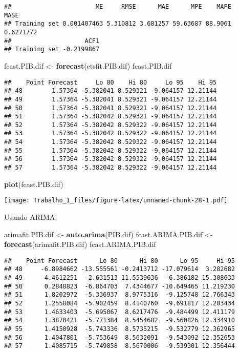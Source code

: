 \documentclass[]{article}
\newenvironment{Shaded}{\begin{snugshade}}{\end{snugshade}}
\newcommand{\KeywordTok}[1]{\textcolor[rgb]{0.13,0.29,0.53}{\textbf{#1}}}
\newcommand{\StringTok}[1]{\textcolor[rgb]{0.31,0.60,0.02}{#1}}
\newcommand{\NormalTok}[1]{#1}
\begin{document}
\begin{verbatim}
##                       ME     RMSE      MAE      MPE    MAPE      MASE
## Training set 0.001407463 5.310812 3.681257 59.63687 88.9061 0.6271772
##                    ACF1
## Training set -0.2199867
\end{verbatim}

\begin{Shaded}
\begin{Highlighting}[]
\NormalTok{fcast.PIB.dif <-}\StringTok{ }\KeywordTok{forecast}\NormalTok{(etsfit.PIB.dif)}
\NormalTok{fcast.PIB.dif}
\end{Highlighting}
\end{Shaded}

\begin{verbatim}
##    Point Forecast     Lo 80    Hi 80     Lo 95    Hi 95
## 48        1.57364 -5.382041 8.529321 -9.064157 12.21144
## 49        1.57364 -5.382041 8.529321 -9.064157 12.21144
## 50        1.57364 -5.382041 8.529321 -9.064157 12.21144
## 51        1.57364 -5.382042 8.529321 -9.064157 12.21144
## 52        1.57364 -5.382042 8.529322 -9.064157 12.21144
## 53        1.57364 -5.382042 8.529322 -9.064157 12.21144
## 54        1.57364 -5.382042 8.529322 -9.064157 12.21144
## 55        1.57364 -5.382042 8.529322 -9.064157 12.21144
## 56        1.57364 -5.382042 8.529322 -9.064157 12.21144
## 57        1.57364 -5.382042 8.529322 -9.064157 12.21144
\end{verbatim}

\begin{Shaded}
\begin{Highlighting}[]
\KeywordTok{plot}\NormalTok{(fcast.PIB.dif)}
\end{Highlighting}
\end{Shaded}

\texttt{[image: Trabalho\_I\_files/figure-latex/unnamed-chunk-28-1.pdf]}

Usando ARIMA:

\begin{Shaded}
\begin{Highlighting}[]
\NormalTok{arimafit.PIB.dif <-}\StringTok{ }\KeywordTok{auto.arima}\NormalTok{(PIB.dif)}
\NormalTok{fcast.ARIMA.PIB.dif <-}\StringTok{ }\KeywordTok{forecast}\NormalTok{(arimafit.PIB.dif)}
\NormalTok{fcast.ARIMA.PIB.dif}
\end{Highlighting}
\end{Shaded}

\begin{verbatim}
##    Point Forecast      Lo 80      Hi 80      Lo 95     Hi 95
## 48     -6.8984662 -13.555561 -0.2413712 -17.079614  3.282682
## 49      4.4612251  -2.631513 11.5539636  -6.386182 15.308633
## 50      0.2848823  -6.864703  7.4344677 -10.649465 11.219230
## 51      1.8202972  -5.336937  8.9775316  -9.125748 12.766343
## 52      1.2558084  -5.902459  8.4140760  -9.691817 12.203434
## 53      1.4633403  -5.695067  8.6217476  -9.484499 12.411179
## 54      1.3870421  -5.771384  8.5454682  -9.560826 12.334910
## 55      1.4150928  -5.743336  8.5735215  -9.532779 12.362965
## 56      1.4047801  -5.753649  8.5632091  -9.543092 12.352653
## 57      1.4085715  -5.749858  8.5670006  -9.539301 12.356444
\end{verbatim}
\end{document}
